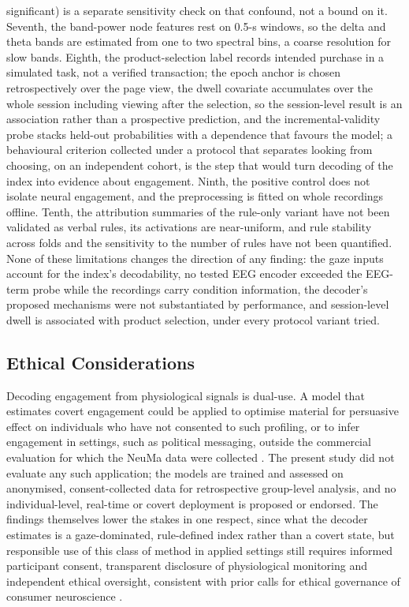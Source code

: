 significant) is a separate sensitivity check on that confound, not a bound on it. Seventh, the band-power node features rest on 0.5-s windows, so the delta and theta bands are estimated from one to two spectral bins, a coarse resolution for slow bands. Eighth, the product-selection label records intended purchase in a simulated task, not a verified transaction; the epoch anchor is chosen retrospectively over the page view, the dwell covariate accumulates over the whole session including viewing after the selection, so the session-level result is an association rather than a prospective prediction, and the incremental-validity probe stacks held-out probabilities with a dependence that favours the model; a behavioural criterion collected under a protocol that separates looking from choosing, on an independent cohort, is the step that would turn decoding of the index into evidence about engagement. Ninth, the positive control does not isolate neural engagement, and the preprocessing is fitted on whole recordings offline. Tenth, the attribution summaries of the rule-only variant have not been validated as verbal rules, its activations are near-uniform, and rule stability across folds and the sensitivity to the number of rules have not been quantified. None of these limitations changes the direction of any finding: the gaze inputs account for the index's decodability, no tested EEG encoder exceeded the EEG-term probe while the recordings carry condition information, the decoder's proposed mechanisms were not substantiated by performance, and session-level dwell is associated with product selection, under every protocol variant tried.

\subsection{Ethical Considerations}\label{disc:ethics}

Decoding engagement from physiological signals is dual-use. A model that estimates covert engagement could be applied to optimise material for persuasive effect on individuals who have not consented to such profiling, or to infer engagement in settings, such as political messaging, outside the commercial evaluation for which the NeuMa data were collected \cite{ref35}. The present study did not evaluate any such application; the models are trained and assessed on anonymised, consent-collected data for retrospective group-level analysis, and no individual-level, real-time or covert deployment is proposed or endorsed. The findings themselves lower the stakes in one respect, since what the decoder estimates is a gaze-dominated, rule-defined index rather than a covert state, but responsible use of this class of method in applied settings still requires informed participant consent, transparent disclosure of physiological monitoring and independent ethical oversight, consistent with prior calls for ethical governance of consumer neuroscience \cite{ref33}.

